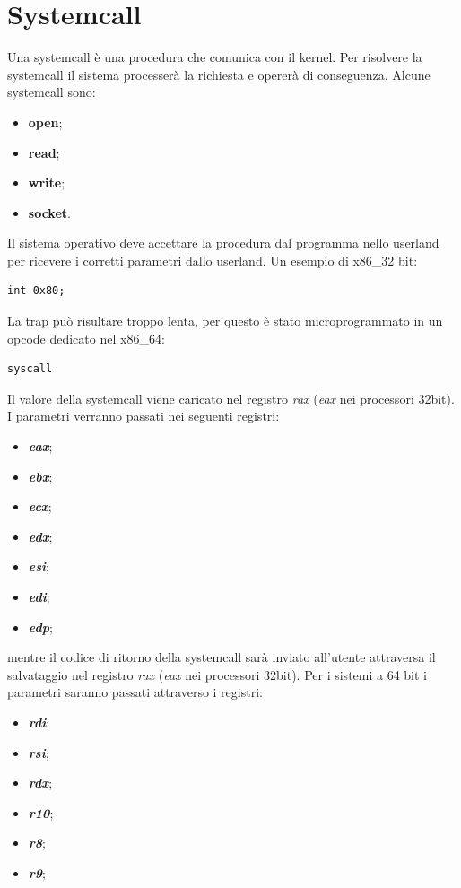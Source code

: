 \section{Systemcall}
Una systemcall è una procedura che comunica con il kernel. Per risolvere la systemcall il sistema processerà la richiesta e opererà di conseguenza.
Alcune systemcall sono:
\begin{itemize}
    \item \textbf{open};
    \item \textbf{read};
    \item \textbf{write};
    \item \textbf{socket}.
\end{itemize}

Il sistema operativo deve accettare la procedura dal programma nello userland per ricevere i corretti parametri dallo userland.
Un esempio di x86\_32 bit: 
\begin{lstlisting}[language={[x86masm]Assembler}]
    int 0x80;
\end{lstlisting}
La trap può risultare troppo lenta, per questo è stato microprogrammato in un opcode dedicato nel x86\_64:
\begin{lstlisting}[language={[x86masm]Assembler}]
    syscall
\end{lstlisting}
Il valore della systemcall viene caricato nel registro \textit{rax} (\textit{eax} nei processori 32bit).
I parametri verranno passati nei seguenti registri:
\begin{itemize}
    \item \textit{\textbf{eax}};
    \item \textit{\textbf{ebx}};
    \item \textit{\textbf{ecx}};
    \item \textit{\textbf{edx}};
    \item \textit{\textbf{esi}};
    \item \textit{\textbf{edi}};
    \item \textit{\textbf{edp}};
\end{itemize}
mentre il codice di ritorno della systemcall sarà inviato all'utente attraversa il salvataggio nel registro \textit{rax} (\textit{eax} nei processori 32bit).
Per i sistemi a 64 bit i parametri saranno passati attraverso i registri:
\begin{itemize}
    \item \textit{\textbf{rdi}};
    \item \textit{\textbf{rsi}};
    \item \textit{\textbf{rdx}};
    \item \textit{\textbf{r10}};
    \item \textit{\textbf{r8}};
    \item \textit{\textbf{r9}};
\end{itemize}


